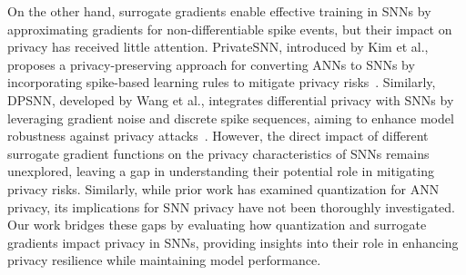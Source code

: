On the other hand, surrogate gradients enable effective training in SNNs by approximating gradients for non-differentiable spike events,  but their impact on privacy has received little attention. PrivateSNN, introduced by Kim et al., proposes a privacy-preserving approach for converting ANNs to SNNs by incorporating spike-based learning rules to mitigate privacy risks~\cite{kim2022privatesnn}. Similarly, DPSNN, developed by Wang et al., integrates differential privacy with SNNs by leveraging gradient noise and discrete spike sequences, aiming to enhance model robustness against privacy attacks~\cite{wang2022dpsnn}. However, the direct impact of different surrogate gradient functions on the privacy characteristics of SNNs remains unexplored, leaving a gap in understanding their potential role in mitigating privacy risks. Similarly, while prior work has examined quantization for ANN privacy, its implications for SNN privacy have not been thoroughly investigated. Our work bridges these gaps by evaluating how quantization and surrogate gradients impact privacy in SNNs, providing insights into their role in enhancing privacy resilience while maintaining model performance.




